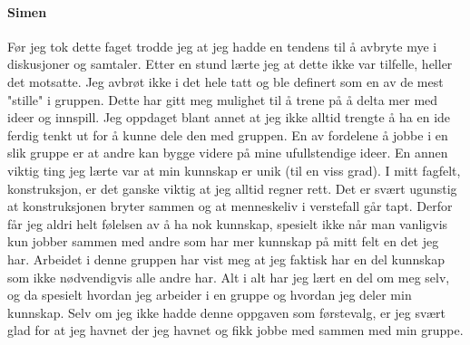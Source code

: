 \paragraph{Simen}
Før jeg tok dette faget trodde jeg at jeg hadde en tendens til å avbryte mye i diskusjoner og samtaler.
Etter en stund lærte jeg at dette ikke var tilfelle, heller det motsatte.
Jeg avbrøt ikke i det hele tatt og ble definert som en av de mest "stille" i gruppen.
Dette har gitt meg mulighet til å trene på å delta mer med ideer og innspill.
Jeg oppdaget blant annet at jeg ikke alltid trengte å ha en ide ferdig tenkt ut for å kunne dele den med gruppen.
En av fordelene å jobbe i en slik gruppe er at andre kan bygge videre på mine ufullstendige ideer.
En annen viktig ting jeg lærte var at min kunnskap er unik (til en viss grad).
I mitt fagfelt, konstruksjon, er det ganske viktig at jeg alltid regner rett.
Det er svært ugunstig at konstruksjonen bryter sammen og at menneskeliv i verstefall går tapt.
Derfor får jeg aldri helt følelsen av å ha nok kunnskap, spesielt ikke når man vanligvis kun jobber sammen med andre som har mer kunnskap på mitt felt en det jeg har.
Arbeidet i denne gruppen har vist meg at jeg faktisk har en del kunnskap som ikke nødvendigvis alle andre har.
Alt i alt har jeg lært en del om meg selv, og da spesielt hvordan jeg arbeider i en gruppe og hvordan jeg deler min kunnskap.
Selv om jeg ikke hadde denne oppgaven som førstevalg, er jeg svært glad for at jeg havnet der jeg havnet og fikk jobbe med sammen med min gruppe.
 
 
 
 
 
 
 
 
 
 
 
 
 
 
 
 
 
 
 
 
 
 
 
 